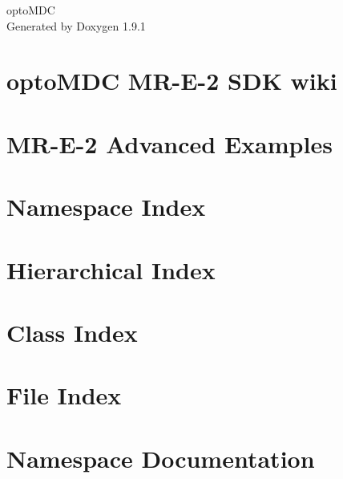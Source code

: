 \let\mypdfximage\pdfximage\def\pdfximage{\immediate\mypdfximage}\documentclass[twoside]{book}
\newcommand{\+}{\discretionary{\mbox{\scriptsize$\hookleftarrow$}}{}{}}
\newcommand{\clearemptydoublepage}{%
  \newpage{\pagestyle{empty}\cleardoublepage}%
}
\begin{document}
\raggedbottom

\hypersetup{pageanchor=false,
             bookmarksnumbered=true,
             pdfencoding=unicode
            }
\begin{titlepage}
\vspace*{7cm}
\begin{center}%
{\Large opto\+MDC }\\
\vspace*{1cm}
{\large Generated by Doxygen 1.9.1}\\
\end{center}
\end{titlepage}
\clearemptydoublepage
{}
\tableofcontents
\clearemptydoublepage
{}
\hypersetup{pageanchor=true}

\chapter{opto\+MDC MR-\/\+E-\/2 SDK wiki}
\label{index}\hypertarget{index}{}
\chapter{MR-\/\+E-\/2 Advanced Examples}
\label{examples}

\chapter{Namespace Index}

\chapter{Hierarchical Index}

\chapter{Class Index}

\chapter{File Index}

\chapter{Namespace Documentation}













\end{document}
